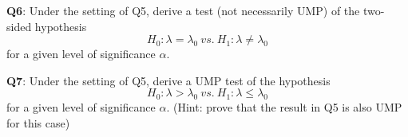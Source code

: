 \documentclass[]{article}
\begin{document}
\textbf{Q6}: Under the setting of Q5, derive a test (not necessarily
UMP) of the two-sided hypothesis
\[H_0:\lambda =\lambda_0\ vs.\ H_1:\lambda \neq \lambda_0\] for a given
level of significance \(\alpha\).

\textbf{Q7}: Under the setting of Q5, derive a UMP test of the
hypothesis \[H_0:\lambda > \lambda_0\ vs.\ H_1:\lambda \le \lambda_0\]
for a given level of significance \(\alpha\). (Hint: prove that the
result in Q5 is also UMP for this case)
\end{document}
